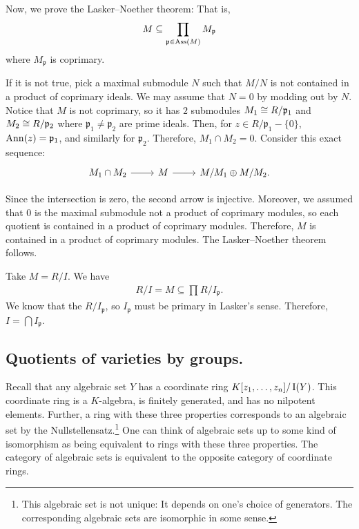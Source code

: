 \documentclass [11 pt, oneside] {article}
\begin{document}
Now, we prove the Lasker--Noether theorem: That is, 
\begin{align*}
	M\subseteq \prod_{\mathfrak{p} \in \operatorname{Ass} (M)} M_{\mathfrak{p}}
\end{align*}
where $M_{\mathfrak{p}}$ is coprimary.  

If it is not true, pick a maximal submodule $N$ such that $M/N$ is not contained in a product of coprimary ideals. We may assume that $N=0$ by modding out by $N$. Notice that $M$ is not coprimary, so it has $2$ submodules $M_1\cong R/\mathfrak{p}_1$ and $M_2\cong R/\mathfrak{p}_2$ where $\mathfrak{p}_1\ne \mathfrak{p}_2$ are prime ideals. Then, for $z\in R/\mathfrak{p}_1- \{0\}$, $\operatorname{Ann}(z)= \mathfrak{p}_1$, and similarly for $\mathfrak{p}_2$. Therefore, $M_1\cap M_2=0$. Consider this exact sequence:
\[
\begin{tikzcd}
M_1\cap M_2 \ar[r]& M\ar[r]& M/M_1 \oplus M/M_2.
\end{tikzcd}
\]

Since the intersection is zero, the second arrow is injective. Moreover, we assumed that $0$ is the maximal submodule not a product of coprimary modules, so each quotient is contained in a product of coprimary modules. Therefore, $M$ is contained in a product of coprimary modules. The Lasker--Noether theorem follows.

Take $M=R/I$. We have 
\begin{align*}
	R/I = M \subseteq \prod_{} R/I_{\mathfrak{p}}.
\end{align*}
We know that the $R/I_{\mathfrak{p}}$, so $I_{\mathfrak{p}}$ must be primary in Lasker's sense. Therefore, $I=\bigcap I_{\mathfrak{p}}$.

\subsection{Quotients of varieties by groups.}
Recall that any algebraic set $Y$ has a coordinate ring $K[z_1,\hdots, z_n]/\operatorname{I}(Y)$. This coordinate ring is a $K$-algebra, is finitely generated, and has no nilpotent elements. Further, a ring with these three properties corresponds to an algebraic set by the Nullstellensatz.\footnote{This algebraic set is not unique: It depends on one's choice of generators. The corresponding algebraic sets are isomorphic in some sense.} One can think of algebraic sets up to some kind of isomorphism as being equivalent to rings with these three properties. The category of algebraic sets is equivalent to the opposite category of coordinate rings. 
\end{document}
